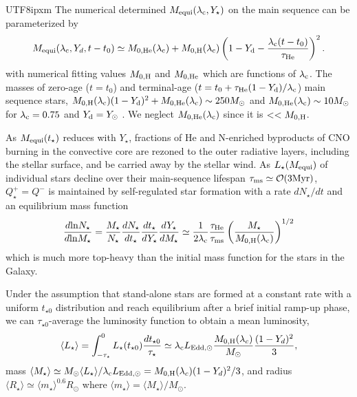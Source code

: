 \documentclass[linenumbers,trackchanges]{aastex701}
\begin{document}
\begin{CJK*}{UTF8}{ipxm}
The numerical determined $M_{\rm equi} (\lambda_{\rm c}, Y_\star)$ 
on the main sequence can be parameterized by
\begin{equation}
        M_{\rm equi}(\lambda_{\rm c}, Y_d, t -t_0) 
        \simeq  M_{0, \rm He}(\lambda_{\rm c})+ 
        M_{0, \rm H}(\lambda_{\rm c})
        \left(1- Y_{\rm d} - {\lambda_{\rm c} (t-t_0) 
        \over  \tau_{\rm He}}\right)^2.
\label{eq:mevolve}
\end{equation}
with numerical fitting values $M_{0, \rm H}$ and 
$M_{0, \rm He}$ which are functions of $\lambda_{\rm c}$.  
The masses of zero-age ($t=t_0$) and terminal-age 
($t=t_0+\tau_{\rm He} (1-Y_{\rm d})/\lambda_{\rm c}$) 
main sequence stars, $M_{0, \rm H}(\lambda_{\rm c}) 
(1-Y_{\rm d})^2 + M_{0, \rm He} (\lambda_{\rm c})
\sim 250 M_\odot$ and $M_{0, \rm He} (\lambda_{\rm c}) 
\sim 10 M_\odot $ for $\lambda_{\rm c} =0.75$
and $Y_{\rm d} = Y_\odot$ \citep{xuetal2025}.
We neglect $M_{0, \rm He} (\lambda_{\rm c})$ since it is 
$< < M_{\rm 0, H}$.

As $M_{\rm equi} (t_\star)$ reduces with $Y_\star$, 
fractions of He and N-enriched 
byproducts of CNO burning in the convective core are rezoned
to the outer radiative layers, including the stellar surface, and 
be carried away by the stellar 
wind.  As  $L_\star (M_{\rm equi})$ of individual stars decline 
over their
main-sequence lifespan $\tau_{\rm ms} \simeq  {\mathcal O} 
(3 {\rm Myr})$,  $Q^+ _\star=Q^-$ is 
maintained by self-regulated star formation with a rate 
$d N_\star/dt$ and an equilibrium mass function
\begin{equation}
    {d {\rm ln} N_\star \over d {\rm ln}  M_\star} = 
    {M_\star \over N_\star} {d N_\star \over d t_\star} {d t_\star 
\over d Y_\star}
{d Y_\star \over d M_\star} \simeq {1 \over 
    2\lambda_{\rm c}}
    {\rm \tau_{\rm He} 
    \over \tau_{\rm ms}} 
    \left( M_\star \over 
    M_{0, \rm H}(\lambda_{\rm c}) \right)^{1/2}
\end{equation}
which is much more top-heavy than the initial mass function 
for the stars in the Galaxy.

Under the assumption that stand-alone stars are formed at 
a constant rate with a uniform $t_{\star 0}$ distribution 
and reach equilibrium after a brief initial ramp-up
phase, we can $\tau_{\star 0}$-average the luminosity function 
to obtain a mean luminosity,  
\begin{equation}
\langle L_\star \rangle =
\int_{-\tau_{\star}} ^0 
L_\star (t_{\star 0}) {d t_{\star 0} \over \tau_\star}   
\simeq \lambda_{\rm c}  L_{\rm Edd, \odot} 
 {M_{0, \rm H} (\lambda_c) \over M_\odot}
{(1-Y_d)^2 \over 3},
\label{eq:tildet}
\end{equation}
mass $\langle M_\star \rangle \simeq M_\odot \langle  
L_\star \rangle / \lambda_{\rm c} L_{\rm Edd, \odot}
=M_{0, \rm H} (\lambda_c)(1-Y_d)^2 / 3$,
and radius $\langle R_\star \rangle \simeq \langle
m_\star \rangle ^{0.6} R_\odot$ where $ \langle 
m_\star \rangle = \langle  M_\star \rangle / M_\odot$. 


\end{CJK*}
\end{document}
